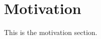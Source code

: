 \documentclass[proposal.tex]{subfiles}
\begin{document}
    
\section{Motivation}

This is the motivation section.
\end{document}
